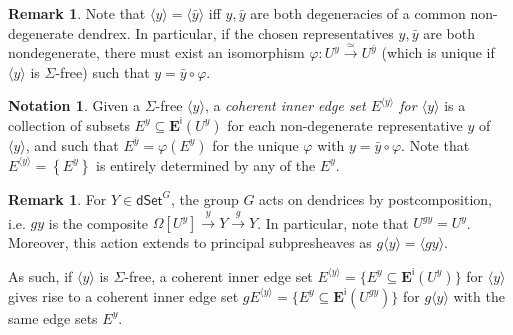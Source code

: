 \documentclass[a4paper,10pt
,draft
]{article}%
\numberwithin{equation}{section}
\numberwithin{figure}{section}
\theoremstyle{definition} %
\newtheorem{remark}[equation]{Remark}%
\newtheorem{notation}[equation]{Notation}%
\newcommand{\1}{\ensuremath{\mathbbm 1}}%
\begin{document}
\begin{remark}
	Note that
	$\langle y \rangle = \langle \bar{y} \rangle$
	iff $y,\bar{y}$ are both degeneracies of a common non-degenerate dendrex.
	In particular, if the chosen representatives $y,\bar{y}$ are both nondegenerate,
	there must exist an isomorphism
	$\varphi \colon U^y \xrightarrow{\simeq} U^{\bar{y}}$
	(which is unique if 
	$\langle y \rangle$ is $\Sigma$-free)
	such that $y= \bar{y} \circ \varphi$.
\end{remark}



\begin{notation}
	Given a $\Sigma$-free $\langle y \rangle$,
	a \emph{coherent inner edge set $E^{\langle y \rangle}$ for $\langle y \rangle$}
	is a collection of subsets 
	$E^y \subseteq \boldsymbol{E}^{\mathsf{i}}(U^y)$
	for each non-degenerate representative $y$ of $\langle y \rangle$, and such that 
	$E^{\bar{y}}  = \varphi \left(E^y \right)$
	for the unique $\varphi$ with $y= \bar{y} \circ \varphi$.
	Note that $E^{\langle y \rangle} = \left\{E^y \right\}$
	is entirely determined by any of the $E^y$.
\end{notation}


\begin{remark}\label{PRINGACT REM}
	For $Y \in \mathsf{dSet}^G$, the group $G$
	acts on dendrices by postcomposition,
	i.e. $gy$ is the composite
	$\Omega[U^y] \xrightarrow{y} Y \xrightarrow{g} Y$.
	In particular, note that $U^{gy} = U^{y}$.
	Moreover, this action extends to principal subpresheaves as
	$g \langle y \rangle = \langle g y \rangle$.
	
	As such, if $\langle y\rangle$ is $\Sigma$-free, a coherent inner edge set 
	$E^{\langle y \rangle} = \{E^y \subseteq \boldsymbol{E}^{\mathsf{i}}(U^y)\}$
	for $\langle y \rangle$
	gives rise to a coherent inner edge set 
	$g E^{\langle y \rangle} = \{E^y \subseteq \boldsymbol{E}^{\mathsf{i}}(U^{gy})\}$
	for $g\langle y \rangle$
	with the same edge sets $E^y$.
\end{remark}
\end{document}

